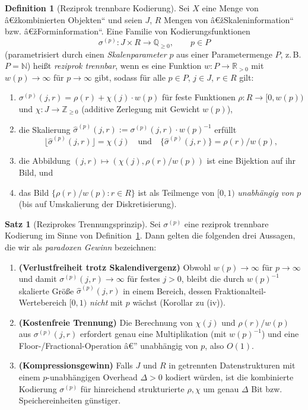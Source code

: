 ﻿\documentclass[a4paper,12pt]{article}
\theoremstyle{definition}
\newtheorem{definition}{Definition}
\newtheorem{satz}{Satz}
\begin{document}
\begin{definition}[Reziprok trennbare Kodierung]
\label{def:rtk}
	Sei $X$ eine Menge von â€žkombinierten Objekten`` und seien $J$, $R$
	Mengen von â€žSkaleninformation`` bzw. â€žForminformation``. Eine Familie
	von Kodierungsfunktionen
	\[
		\sigma^{(p)} : J \times R \longrightarrow \mathbb{Q}_{\geq 0},
		\qquad p \in P
	\]
	(parametrisiert durch einen \emph{Skalenparameter} $p$ aus einer
	Parametermenge $P$, z.\,B. $P=\mathbb{N}$) heißt
	\emph{reziprok trennbar}, wenn es eine Funktion $w:P\to\mathbb{R}_{>0}$
	mit $w(p)\to\infty$ für $p\to\infty$ gibt, sodass für alle $p\in P$,
	$j\in J$, $r\in R$ gilt:
	\begin{enumerate}[label=(\roman*)]
		\item $\sigma^{(p)}(j,r) = \rho(r) + \chi(j)\cdot w(p)$ für feste
		      Funktionen $\rho:R\to[0, w(p))$ und $\chi:J\to\mathbb{Z}_{\geq0}$
		      (additive Zerlegung mit Gewicht $w(p)$),
		\item die Skalierung $\hat\sigma^{(p)}(j,r) := \sigma^{(p)}(j,r)\cdot w(p)^{-1}$
		      erfüllt
		      \[
			      \lfloor \hat\sigma^{(p)}(j,r) \rfloor = \chi(j)
			      \quad\text{und}\quad
			      \{\hat\sigma^{(p)}(j,r)\} = \rho(r)/w(p),
		      \]
		\item die Abbildung $(j,r)\mapsto(\chi(j),\rho(r)/w(p))$ ist eine
		      Bijektion auf ihr Bild, und
		\item das Bild $\{\rho(r)/w(p) : r\in R\}$ ist als Teilmenge von
		      $[0,1)$ \emph{unabhängig von $p$} (bis auf Umskalierung der
		      Diskretisierung).
	\end{enumerate}
\end{definition}

\begin{satz}[Reziprokes Trennungsprinzip]
\label{satz:rtp}
	Sei $\sigma^{(p)}$ eine reziprok trennbare Kodierung im Sinne von
	Definition~\ref{def:rtk}. Dann gelten die folgenden drei Aussagen, die
	wir als \emph{paradoxen Gewinn} bezeichnen:
	\begin{enumerate}[label=(G\arabic*)]
		\item \textbf{(Verlustfreiheit trotz Skalendivergenz)} Obwohl
		      $w(p)\to\infty$ für $p\to\infty$ und damit
		      $\sigma^{(p)}(j,r)\to\infty$ für festes $j>0$, bleibt die durch
		      $w(p)^{-1}$ skalierte Größe $\hat\sigma^{(p)}(j,r)$ in einem
		      Bereich, dessen Fraktionalteil-Wertebereich $[0,1)$ \emph{nicht}
		      mit $p$ wächst (Korollar zu (iv)).
		\item \textbf{(Kostenfreie Trennung)} Die Berechnung von $\chi(j)$ und
		      $\rho(r)/w(p)$ aus $\sigma^{(p)}(j,r)$ erfordert genau eine
		      Multiplikation (mit $w(p)^{-1}$) und eine
		      Floor-/Fractional-Operation â€” unabhängig von $p$, also $O(1)$.
		\item \textbf{(Kompressionsgewinn)} Falls $J$ und $R$ in getrennten
		      Datenstrukturen mit einem $p$-unabhängigen Overhead $\Delta>0$
		      kodiert würden, ist die kombinierte Kodierung $\sigma^{(p)}$ für
		      hinreichend strukturierte $\rho,\chi$ um genau $\Delta$ Bit
		      bzw. Speichereinheiten günstiger.
	\end{enumerate}
\end{satz}
\end{document}

